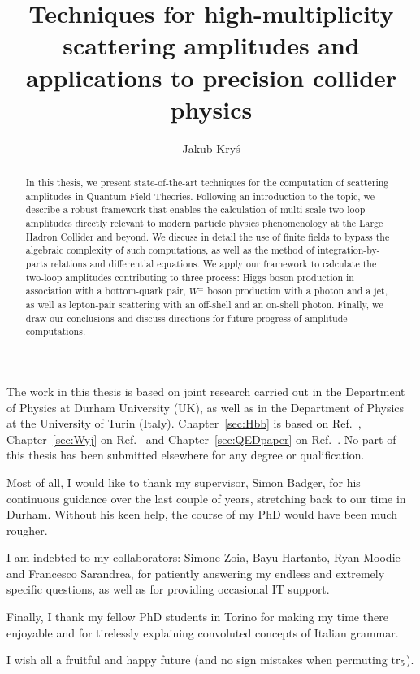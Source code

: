\documentclass[twoside,frontopenright,halfspacing, openany]{ip3thesis}
\begin{document}
\title{Techniques for high-multiplicity scattering amplitudes and applications to precision collider physics}
\author{Jakub Kry\'s}
\maketitlepage*

\begin{abstract}
%
	In this thesis, we present state-of-the-art techniques for the computation of scattering amplitudes in Quantum Field Theories. Following an introduction to the topic, we describe a robust framework that enables the calculation of multi-scale two-loop amplitudes directly relevant to modern particle physics phenomenology at the Large Hadron Collider and beyond. We discuss in detail the use of finite fields to bypass the algebraic complexity of such computations, as well as the method of integration-by-parts relations and differential equations. We apply our framework to calculate the two-loop amplitudes contributing to three process: Higgs boson production in association with a bottom-quark pair, $W^\pm$ boson production with a photon and a jet, as well as lepton-pair scattering with an off-shell and an on-shell photon. Finally, we draw our conclusions and discuss directions for future progress of amplitude computations.
%
\end{abstract}

\disableprotrusion
\tableofcontents*
\enableprotrusion

\begin{declaration*}
%
	The work in this thesis is based on joint research carried out in the Department of Physics at Durham University (UK), as well as in the Department of Physics at the University of Turin (Italy). Chapter~\ref{sec:Hbb} is based on Ref.~\cite{Badger:2021ega}, Chapter~\ref{sec:Wyj} on Ref.~\cite{Badger:2022ncb} and Chapter~\ref{sec:QEDpaper} on Ref.~\cite{Badger:2023xtl}. No part of this thesis has been submitted elsewhere for any degree or qualification.  
%
\end{declaration*}

\begin{acknowledgements*}
%
	Most of all, I would like to thank my supervisor, Simon Badger, for his continuous guidance over the last couple of years, stretching back to our time in Durham. Without his keen help, the course of my PhD would have been much rougher.
 
    I am indebted to my collaborators: Simone Zoia, Bayu Hartanto, Ryan Moodie and Francesco Sarandrea, for patiently answering my endless and extremely specific questions, as well as for providing occasional IT support.
    
    Finally, I thank my fellow PhD students in Torino for making my time there enjoyable and for tirelessly explaining convoluted concepts of Italian grammar.
    
    I wish all a fruitful and happy future (and no sign mistakes when permuting $\operatorname{\rm tr}_5$).
%
\end{acknowledgements*}
\end{document}
